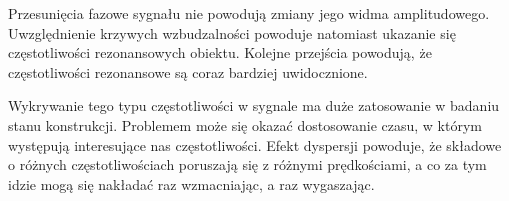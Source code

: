 Przesunięcia fazowe sygnału nie powodują zmiany jego widma amplitudowego. Uwzględnienie krzywych wzbudzalności powoduje natomiast ukazanie się częstotliwości rezonansowych obiektu. Kolejne przejścia powodują, że częstotliwości rezonansowe są coraz bardziej uwidocznione.

Wykrywanie tego typu częstotliwości w sygnale ma duże zatosowanie w badaniu stanu konstrukcji. Problemem może się okazać dostosowanie czasu, w którym występują interesujące nas częstotliwości. Efekt dyspersji powoduje, że składowe o różnych częstotliwościach poruszają się z różnymi prędkościami, a co za tym idzie mogą się nakładać raz wzmacniając, a raz wygaszając.



